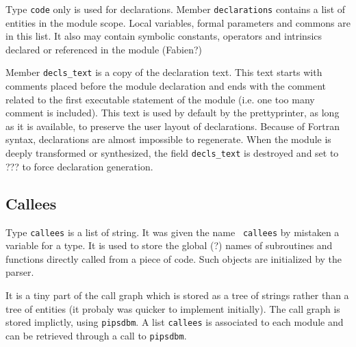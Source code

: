 {Type {\tt code} only is used for declarations. Member {\tt declarations}
contains a list of entities in the module scope. Local variables, formal
parameters and commons are in this list. It also may contain symbolic
constants, operators and intrinsics declared or referenced in the module
(Fabien?)

\iffalse
Le domaine \verb/code/ est utilise'
pour stocker le corps des modules. Le sous-domaine \verb/declarations/
contient une liste d'entite's qui sont les variables locales,
parame`ters formels et commons de'clare's dans la fonction.
\fi

Member {\tt decls_text} is a copy of the declaration text. This text
starts with comments placed before the module declaration and ends with
the comment related to the first executable statement of the module
(i.e. one too many comment is included). This text is used by default by
the prettyprinter, as long as it is available, to preserve the user
layout of declarations. Because of Fortran syntax, declarations are
almost impossible to regenerate. When the module is deeply transformed
or synthesized, the field {\tt decls_text} is destroyed and set to ???
to force declaration generation.

\iffalse
Le sous-domaine {\tt decls\_text} contient le texte exact de toutes les
de'clarations du module; ce texte est utilise' par de'faut par le
prettyprinter tant qu'il existe. Quand le code a e'te' fortement
transforme', le prettyprinter re'ge'ne`re des de'clarations
synthe'tiques.
\fi

\subsection{Callees}
\label{subsection-callees}


{}

Type {\tt callees} is a list of string. It was given the name {\tt
callees} by mistaken a variable for a type. It is used to store the
global (?) names of subroutines and functions directly called from a
piece of code. Such objects are initialized by the parser.

It is a tiny part of the call graph which is stored as a tree of strings
rather than a tree of entities (it probaly was quicker to implement
initially). The call graph is stored implictly, using {\tt pipsdbm}. A
list {\tt callees} is associated to each module and can be retrieved
through a call to {\tt pipsdbm}.

}
